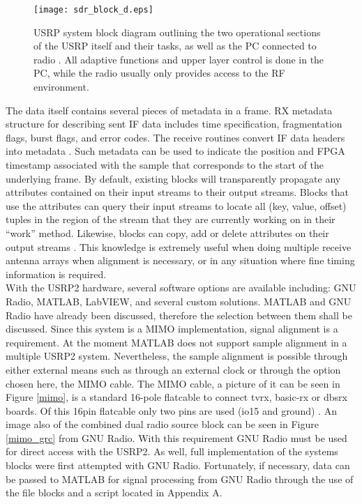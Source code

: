 \begin{figure}[!ht]
\centering
\texttt{[image: sdr\_block\_d.eps]}
\caption{USRP system block diagram outlining the two operational sections of the USRP itself and their tasks, as well as the PC connected to radio \cite{sdr_blocks}.  All adaptive functions and upper layer control is done in the PC, while the radio usually only provides access to the RF environment.}
\end{figure}

The data itself contains several pieces of metadata in a frame.  RX metadata structure for describing sent IF data includes time specification, fragmentation flags, burst flags, and error codes. The receive routines convert IF data headers into metadata \cite{metadata}.  Such metadata can be used to indicate the position and FPGA timestamp associated with the sample that corresponds to the start of the underlying frame. By default, existing blocks will transparently propagate any attributes contained on their input streams to their output streams. Blocks that use the attributes can query their input streams to locate all (key, value, offset) tuples in the region of the stream that they are currently working on in their ``work'' method. Likewise, blocks can copy, add or delete attributes on their output streams \cite{sdr_blog}.  This knowledge is extremely useful when doing multiple receive antenna arrays when alignment is necessary, or in any situation where fine timing information is required.\\

With the USRP2 hardware, several software options are available including: GNU Radio, MATLAB, LabVIEW, and several custom solutions.  MATLAB and GNU Radio have already been discussed, therefore the selection between them shall be discussed.  Since this system is a MIMO implementation, signal alignment is a requirement.  At the moment MATLAB does not support sample alignment in a multiple USRP2 system.  Nevertheless, the sample alignment is possible through either external means such as through an external clock or through the option chosen here, the MIMO cable.  The MIMO cable, a picture of it can be seen in Figure \ref{mimo}, is a standard 16-pole flatcable to connect tvrx, basic-rx or dbsrx boards.  Of this 16pin flatcable only two pins are used (io15 and ground) \cite{mimo_cable}.  An image also of the combined dual radio source block can be seen in Figure \ref{mimo_grc} from GNU Radio.  With this requirement GNU Radio must be used for direct access with the USRP2.  As well, full implementation of the systems blocks were first attempted with GNU Radio.  Fortunately, if necessary, data can be passed to MATLAB for signal processing from GNU Radio through the use of the file blocks and a script located in Appendix A.\\

